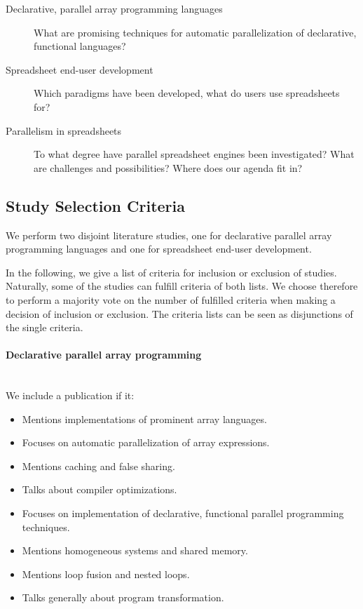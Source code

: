 \documentclass[a4paper]{article}
\begin{document}
\begin{description}
\item[Declarative, parallel array programming languages] What are
  promising techniques for automatic parallelization of declarative,
  functional languages?
\item[Spreadsheet end-user development] Which paradigms have been
  developed, what do users use spreadsheets for?
\item[Parallelism in spreadsheets] To what degree have parallel
  spreadsheet engines been investigated? What are challenges and
  possibilities? Where does our agenda fit in?
\end{description}

\subsection{Study Selection Criteria}
\label{sec:study-select-crit}

We perform two disjoint literature studies, one for declarative parallel array programming languages and one for spreadsheet end-user development.

In the following, we give a list of criteria for inclusion or exclusion of studies. Naturally, some of the studies can fulfill criteria of both lists. We choose therefore to perform a majority vote on the number of fulfilled criteria when making a decision of inclusion or exclusion. The criteria lists can be seen as disjunctions of the single criteria.

\paragraph{Declarative parallel array programming}
~\\

We include a publication if it:

\begin{itemize}
\item Mentions implementations of prominent array languages.
\item Focuses on automatic parallelization of array expressions.
\item Mentions caching and false sharing.
\item Talks about compiler optimizations.
\item Focuses on implementation of declarative, functional parallel
  programming techniques.
\item Mentions homogeneous systems and shared memory.
\item Mentions loop fusion and nested loops.
\item Talks generally about program transformation.
\end{itemize}
\end{document}
